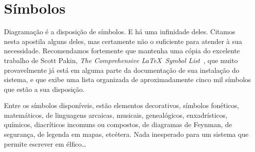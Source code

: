 \section{Símbolos}

Diagramação é a disposição de símbolos. E há uma infinidade
deles. Citamos nesta apostila alguns deles, mas certamente não o
suficiente para atender à sua necessidade. Recomendamos fortemente que
mantenha uma cópia do excelente trabalho de Scott Pakin, \emph{The
  Comprehensive  \LaTeX\ Symbol
  List}~\cite{Pakin2008}, que muito provavelmente
já está em alguma parte da documentação de sua instalação do sistema,
e que exibe uma lista organizada de aproximadamente cinco mil símbolos
que estão a sua disposição. 

Entre os símbolos disponíveis, estão elementos decorativos, símbolos
fonéticos, matemáticos, de linguagens arcaicas, musicais,
genealógicos, enxadrísticos, químicos, diacríticos incomuns ou
compostos, de diagramas de Feynman, de segurança, de legenda em mapas,
etcétera. Nada inesperado para um sistema que permite escrever em
élfico\ldots

